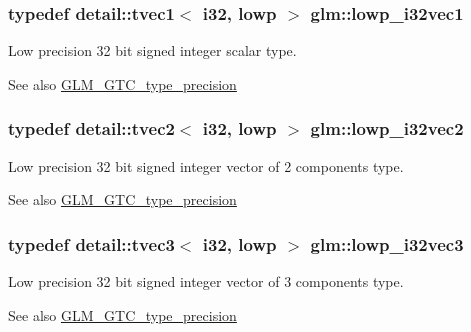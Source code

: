 \subsubsection[{\texorpdfstring{lowp\+\_\+i32vec1}{lowp_i32vec1}}]{\setlength{\rightskip}{0pt plus 5cm}typedef detail\+::tvec1$<$ i32, lowp $>$ {\bf glm\+::lowp\+\_\+i32vec1}}\hypertarget{group__gtc__type__precision_gadb82f1c8a0f4d3304862d32079961974}{}\label{group__gtc__type__precision_gadb82f1c8a0f4d3304862d32079961974}
Low precision 32 bit signed integer scalar type. \begin{DoxySeeAlso}{See also}
\hyperlink{group__gtc__type__precision}{G\+L\+M\+\_\+\+G\+T\+C\+\_\+type\+\_\+precision} 
\end{DoxySeeAlso}
\subsubsection[{\texorpdfstring{lowp\+\_\+i32vec2}{lowp_i32vec2}}]{\setlength{\rightskip}{0pt plus 5cm}typedef detail\+::tvec2$<$ i32, lowp $>$ {\bf glm\+::lowp\+\_\+i32vec2}}\hypertarget{group__gtc__type__precision_ga1ac855a9b4ef24908d00ab715e7ddbff}{}\label{group__gtc__type__precision_ga1ac855a9b4ef24908d00ab715e7ddbff}
Low precision 32 bit signed integer vector of 2 components type. \begin{DoxySeeAlso}{See also}
\hyperlink{group__gtc__type__precision}{G\+L\+M\+\_\+\+G\+T\+C\+\_\+type\+\_\+precision} 
\end{DoxySeeAlso}
\subsubsection[{\texorpdfstring{lowp\+\_\+i32vec3}{lowp_i32vec3}}]{\setlength{\rightskip}{0pt plus 5cm}typedef detail\+::tvec3$<$ i32, lowp $>$ {\bf glm\+::lowp\+\_\+i32vec3}}\hypertarget{group__gtc__type__precision_gaa4a0dd64d4253a3641225254670c7b95}{}\label{group__gtc__type__precision_gaa4a0dd64d4253a3641225254670c7b95}
Low precision 32 bit signed integer vector of 3 components type. \begin{DoxySeeAlso}{See also}
\hyperlink{group__gtc__type__precision}{G\+L\+M\+\_\+\+G\+T\+C\+\_\+type\+\_\+precision} 
\end{DoxySeeAlso}
